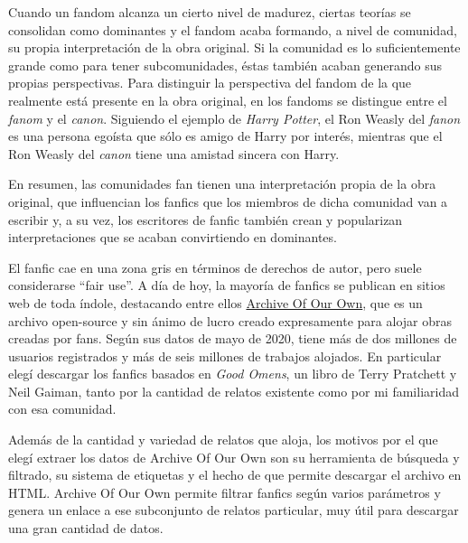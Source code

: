 \documentclass{pre-tfg}
\begin{document}
Cuando un fandom alcanza un cierto nivel de madurez, ciertas teorías se consolidan como dominantes y el fandom acaba formando, a nivel de comunidad, su propia interpretación de la obra original. Si la comunidad es lo suficientemente grande como para tener subcomunidades, éstas también acaban generando sus propias perspectivas. Para distinguir la perspectiva del fandom de la que realmente está presente en la obra original, en los fandoms se distingue entre el \textit{fanom} y el \textit{canon}. Siguiendo el ejemplo de \textit{Harry Potter}, el Ron Weasly del \textit{fanon} es una persona egoísta que sólo es amigo de Harry por interés, mientras que el Ron Weasly del \textit{canon} tiene una amistad sincera con Harry.



En resumen, las comunidades fan tienen una interpretación propia de la obra original, que influencian los fanfics que los miembros de dicha comunidad van a escribir y, a su vez, los escritores de fanfic también crean y popularizan interpretaciones que se acaban convirtiendo en dominantes. 



El fanfic cae en una zona gris en términos de derechos de autor, pero suele considerarse “fair use”. A día de hoy, la mayoría de fanfics se publican en sitios web de toda índole, destacando entre ellos \href{archiveofourown.org}{Archive Of Our Own}, que es un archivo open-source y sin ánimo de lucro creado expresamente para alojar obras creadas por fans. Según sus datos de mayo de 2020, tiene más de dos millones de usuarios registrados y más de seis millones de trabajos alojados. En particular elegí descargar los fanfics basados en \textit{Good Omens}, un libro de Terry Pratchett y Neil Gaiman, tanto por la cantidad de relatos existente como por mi familiaridad con esa comunidad.

Además de la cantidad y variedad de relatos que aloja, los motivos por el que elegí extraer los datos de Archive Of Our Own son su herramienta de búsqueda y filtrado, su sistema de etiquetas y el hecho de que permite descargar el archivo en HTML. Archive Of Our Own permite filtrar fanfics según varios parámetros y genera un enlace a ese subconjunto de relatos particular, muy útil para descargar una gran cantidad de datos.
\end{document}
